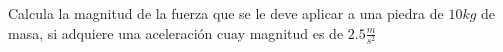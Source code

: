 
\question Calcula la magnitud de la fuerza que se le deve aplicar a una
piedra de $10 kg$ de masa, si adquiere una aceleración cuay magnitud es de
$2.5 \frac{m}{s^2}$

